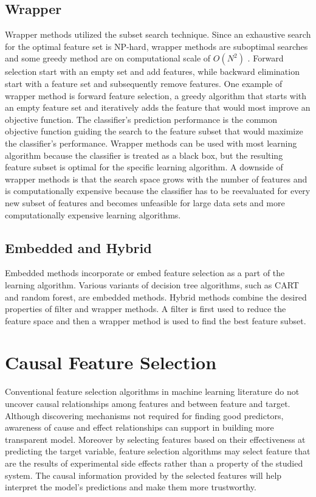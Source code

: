 \subsection{Wrapper}
\indent Wrapper methods utilized the subset search technique. Since an exhaustive search for the optimal feature set is NP-hard, wrapper methods are suboptimal searches and some greedy method are on computational scale of \(O(N^2)\) \cite{Clopinet}. Forward selection start with an empty set and add features, while backward elimination start with a feature set and subsequently remove features. One example of wrapper method is forward feature selection, a greedy algorithm that starts with an empty feature set and iteratively adds the feature that would most improve an objective function. The classifier’s prediction performance is the common objective function guiding the search to the feature subset that would maximize the classifier’s performance. Wrapper methods can be used with most learning algorithm because the classifier is treated as a black box, but the resulting feature subset is optimal for the specific learning algorithm. A downside of wrapper methods is that the search space grows with the number of features and is computationally expensive because the classifier has to be reevaluated for every new subset of features and becomes unfeasible for large data sets and more computationally expensive learning algorithms. 
\subsection{Embedded and Hybrid}
Embedded methods incorporate or embed feature selection as a part of the learning algorithm. Various variants of decision tree algorithms, such as CART and random forest, are embedded methods. Hybrid methods combine the desired properties of filter and wrapper methods. A filter is first used to reduce the feature space and then a wrapper method is used to find the best feature subset.  

\section{Causal Feature Selection}
\indent Conventional feature selection algorithms in machine learning literature do not uncover causal relationships among features and between feature and target. Although discovering mechanisms not required for finding good predictors, awareness of cause and effect relationships can support in building more transparent model. Moreover by selecting features based on their effectiveness at predicting the target variable, feature selection algorithms may select feature that are the results of experimental side effects rather than a property of the studied system. The causal information provided by the selected features will help interpret the model’s predictions and make them more trustworthy. 

